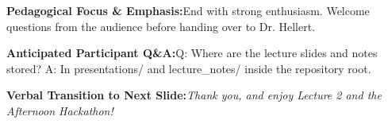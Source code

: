 \documentclass[11pt,a4paper]{article}
\begin{document}
\vspace{0.2em}
\begin{tcolorbox}[colback=lightbg,colframe=bordergray,left=6pt,right=6pt,top=3pt,bottom=3pt,boxrule=0.6pt,arc=2.5pt]
\small
\noindent\textbf{\color{navy}Pedagogical Focus \& Emphasis:}\enspace End with strong enthusiasm. Welcome questions from the audience before handing over to Dr. Hellert.\par\vspace{0.3em}
\noindent\textbf{\color{successgreen}Anticipated Participant Q\&A:}\enspace Q: Where are the lecture slides and notes stored? A: In presentations/ and lecture\_notes/ inside the repository root.\par\vspace{0.3em}
\noindent\textbf{\color{accent}Verbal Transition to Next Slide:}\enspace \emph{Thank you, and enjoy Lecture 2 and the Afternoon Hackathon!}
\end{tcolorbox}
\end{document}
